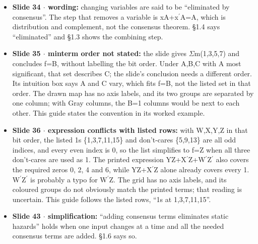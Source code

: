 \documentclass[11pt]{article}
\begin{document}
\begin{keepsection}
\begin{itemize}
\item \textbf{Slide 34 \ensuremath{\cdot} wording:} changing variables are said to be “eliminated by consensus”. The step that removes a variable is xA+x\ensuremath{{}^{\prime}}A=A, which is distribution and complement, not the consensus theorem. §1.4 says “eliminated” and §1.3 shows the combining step.
\item \textbf{Slide 35 \ensuremath{\cdot} minterm order not stated:} the slide gives \ensuremath{\Sigma}m(1,3,5,7) and concludes f=B, without labelling the bit order. Under A,B,C with A most significant, that set describes C; the slide’s conclusion needs a different order. Its intuition box says A and C vary, which fits f=B, not the listed set in that order. The drawn map has no axis labels, and its two groups are separated by one column; with Gray columns, the B=1 columns would be next to each other. This guide states the convention in its worked example.
\item \textbf{Slide 36 \ensuremath{\cdot} expression conflicts with listed rows:} with W,X,Y,Z in that bit order, the listed 1s \{1,3,7,11,15\} and don’t-cares \{5,9,13\} are all odd indices, and every even index is 0, so the list simplifies to f=Z when all three don’t-cares are used as 1. The printed expression YZ+X\ensuremath{{}^{\prime}}Z+W\ensuremath{{}^{\prime}}Z\ensuremath{{}^{\prime}} also covers the required zeros 0, 2, 4 and 6, while YZ+X\ensuremath{{}^{\prime}}Z alone already covers every 1. W\ensuremath{{}^{\prime}}Z\ensuremath{{}^{\prime}} is probably a typo for W\ensuremath{{}^{\prime}}Z. The grid has no axis labels, and its coloured groups do not obviously match the printed terms; that reading is uncertain. This guide follows the listed rows, “1s at 1,3,7,11,15”.
\item \textbf{Slide 43 \ensuremath{\cdot} simplification:} “adding consensus terms eliminates static hazards” holds when one input changes at a time and all the needed consensus terms are added. §1.6 says so.
\end{itemize}
\end{keepsection}
\end{document}
